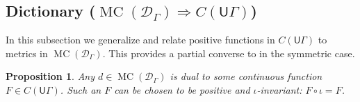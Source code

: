 \documentclass[twoside]{amsart}
\newtheorem{proposition}[theorem]{Proposition}
\theoremstyle{definition}
\numberwithin{equation}{section}
\numberwithin{theorem}{section}
\newcommand{\msf}[1]{\mathsf{#1}}
\newcommand{\calD}{\mathcal{D}}
\newcommand{\G}{\Gamma}
\newcommand{\Ra}{\Rightarrow}
\newcommand{\UG}{\msf{U}\G}
\DeclareMathOperator{\MC}{MC}
\begin{document}





\subsection{Dictionary ($\MC(\calD_\G)\Ra C(\UG)$)}\label{subsec:DCoc}

In this subsection we generalize  and relate positive functions in $C(\UG)$ to metrics in $\MC(\calD_\G)$. This provides a partial converse to  in the symmetric case. 

\begin{proposition}\label{prop:D_G->C}
Any $d\in \MC(\calD_\G)$ is dual to some continuous function $F\in C(\UG)$. Such an $F$ can be chosen to be positive and $\iota$-invariant: $F\circ \iota=F$. 
\end{proposition}
\end{document}

